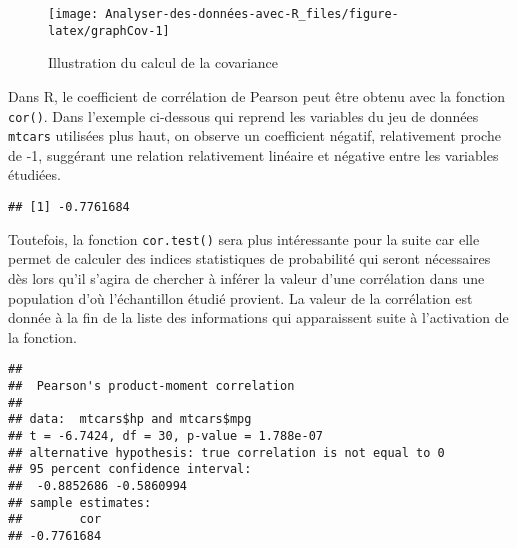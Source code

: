 \documentclass[
  french,
]{book}
\newenvironment{Shaded}{\begin{snugshade}}{\end{snugshade}}
\newcommand{\DataTypeTok}[1]{\textcolor[rgb]{0.13,0.29,0.53}{#1}}
\newcommand{\KeywordTok}[1]{\textcolor[rgb]{0.13,0.29,0.53}{\textbf{#1}}}
\newcommand{\NormalTok}[1]{#1}
\newcommand{\OperatorTok}[1]{\textcolor[rgb]{0.81,0.36,0.00}{\textbf{#1}}}
\newcommand{\StringTok}[1]{\textcolor[rgb]{0.31,0.60,0.02}{#1}}
\begin{document}
\begin{figure}

{\centering \texttt{[image: Analyser-des-données-avec-R\_files/figure-latex/graphCov-1]} 

}

\caption{Illustration du calcul de la covariance}\label{fig:graphCov}
\end{figure}

Dans R, le coefficient de corrélation de Pearson peut être obtenu avec la fonction \texttt{cor()}. Dans l'exemple ci-dessous qui reprend les variables du jeu de données \texttt{mtcars} utilisées plus haut, on observe un coefficient négatif, relativement proche de -1, suggérant une relation relativement linéaire et négative entre les variables étudiées.

\begin{Shaded}
\end{Shaded}

\begin{verbatim}
## [1] -0.7761684
\end{verbatim}

Toutefois, la fonction \texttt{cor.test()} sera plus intéressante pour la suite car elle permet de calculer des indices statistiques de probabilité qui seront nécessaires dès lors qu'il s'agira de chercher à inférer la valeur d'une corrélation dans une population d'où l'échantillon étudié provient. La valeur de la corrélation est donnée à la fin de la liste des informations qui apparaissent suite à l'activation de la fonction.

\begin{Shaded}
\end{Shaded}

\begin{verbatim}
## 
##  Pearson's product-moment correlation
## 
## data:  mtcars$hp and mtcars$mpg
## t = -6.7424, df = 30, p-value = 1.788e-07
## alternative hypothesis: true correlation is not equal to 0
## 95 percent confidence interval:
##  -0.8852686 -0.5860994
## sample estimates:
##        cor 
## -0.7761684
\end{verbatim}
\end{document}
